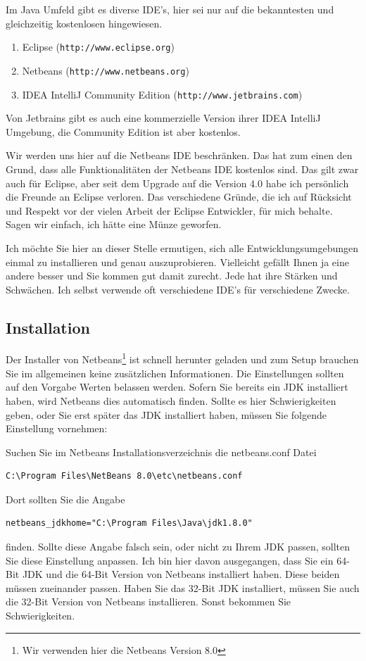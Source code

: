 Im Java Umfeld gibt es diverse IDE's, hier sei nur auf die bekanntesten und gleichzeitig kostenlosen hingewiesen. 

\begin{enumerate}
\item Eclipse (\texttt{http://www.eclipse.org})
\item Netbeans (\texttt{http://www.netbeans.org})
\item IDEA IntelliJ Community Edition (\texttt{http://www.jetbrains.com})
\end{enumerate}
Von Jetbrains gibt es auch eine kommerzielle Version ihrer IDEA IntelliJ Umgebung, die Community Edition ist aber kostenlos.

Wir werden uns hier auf die Netbeans IDE beschränken. Das hat zum einen den Grund, dass alle Funktionalitäten der Netbeans IDE kostenlos sind. Das gilt zwar auch für Eclipse, aber seit dem Upgrade auf die Version 4.0 habe ich persönlich die Freunde an Eclipse verloren. Das verschiedene Gründe, die ich auf Rücksicht und Respekt vor der vielen Arbeit der Eclipse Entwickler, für mich behalte. Sagen wir einfach, ich hätte eine Münze geworfen.

Ich möchte Sie hier an dieser Stelle ermutigen, sich alle Entwicklungsumgebungen einmal zu installieren und genau auszuprobieren. Vielleicht gefällt Ihnen ja eine andere besser und Sie kommen gut damit zurecht. Jede hat ihre Stärken und Schwächen. Ich selbst verwende oft verschiedene IDE's für verschiedene Zwecke.

\subsection{Installation}
Der Installer von Netbeans\footnote{Wir verwenden hier die Netbeans Version 8.0} ist schnell herunter geladen und zum Setup brauchen Sie im allgemeinen keine zusätzlichen Informationen. Die Einstellungen sollten auf den Vorgabe Werten belassen werden. Sofern Sie bereits ein JDK installiert haben, wird Netbeans dies automatisch finden. Sollte es hier Schwierigkeiten geben, oder Sie erst später das JDK installiert haben, müssen Sie folgende Einstellung vornehmen:

Suchen Sie im Netbeans Installationsverzeichnis die netbeans.conf Datei
\begin{Verbatim}
C:\Program Files\NetBeans 8.0\etc\netbeans.conf
\end{Verbatim}
Dort sollten Sie die Angabe
\begin{Verbatim}
netbeans_jdkhome="C:\Program Files\Java\jdk1.8.0"
\end{Verbatim}
finden. Sollte diese Angabe falsch sein, oder nicht zu Ihrem JDK passen, sollten Sie diese Einstellung anpassen.
Ich bin hier davon ausgegangen, dass Sie ein 64-Bit JDK und die 64-Bit Version von Netbeans installiert haben. Diese beiden müssen zueinander passen. Haben Sie das 32-Bit JDK installiert, müssen Sie auch die 32-Bit Version von Netbeans installieren. Sonst bekommen Sie Schwierigkeiten.

